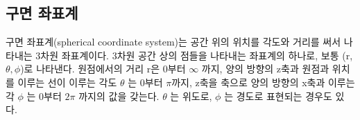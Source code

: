 \begin{flushleft}
\subsection{구면 좌표계}
구면 좌표계(spherical coordinate system)는 공간 위의 위치를 각도와 거리를 써서 나타내는 3차원 좌표계이다. 3차원 공간 상의 점들을 나타내는 좌표계의 하나로, 보통 
(r,$\theta,\phi$)로 나타낸다. 원점에서의 거리 r은 0부터 $\infty$ 까지, 양의 방향의 z축과 원점과 위치를 이루는 선이 이루는 각도 $\theta$ 는 0부터 
$\pi$까지, z축을 축으로 양의 방향의 x축과 이루는 각 $\phi$ 는 0부터 $2\pi$  까지의 값을 갖는다. $\theta$ 는 위도로, $\phi$ 는 경도로 표현되는 경우도 있다.


  \end{flushleft}